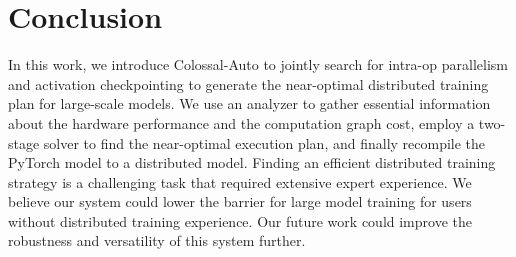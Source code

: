 \section{Conclusion}


In this work, we introduce Colossal-Auto to jointly search for intra-op parallelism and activation checkpointing to generate the near-optimal distributed training plan for large-scale models. We use an analyzer to gather essential information about the hardware performance and the computation graph cost, employ a two-stage solver to find the near-optimal execution plan, and finally recompile the PyTorch model to a distributed model. 
Finding an efficient distributed training strategy is a challenging task that required extensive expert experience. 
We believe our system could lower the barrier for large model training for users without distributed training experience. 
Our future work could improve the robustness and versatility of this system further.